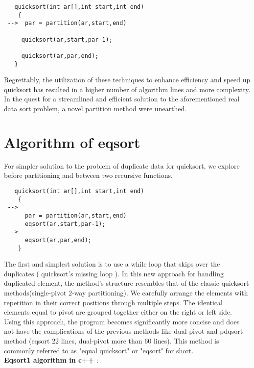 \documentclass{article}
\begin{document}
\begin{lstlisting}
   quicksort(int ar[],int start,int end)
    {
 -->  par = partition(ar,start,end)

     quicksort(ar,start,par-1);

     quicksort(ar,par,end);
   }
\end{lstlisting}

 Regrettably, the utilization of these techniques to enhance efficiency and speed up quicksort has resulted in a higher number of algorithm lines and more complexity. In the quest for a streamlined and efficient solution to the aforementioned real data sort problem, a novel partition method were unearthed.\\

\section {Algorithm of eqsort}

  For simpler solution to the problem of duplicate data for quicksort, we explore before partitioning and between two recursive functions.\\

\begin{lstlisting}
   quicksort(int ar[],int start,int end)
    {
 -->
      par = partition(ar,start,end)
      eqsort(ar,start,par-1);
 -->
      eqsort(ar,par,end);
    }
\end{lstlisting}
The first and simplest solution is to use a while loop that skips over the duplicates ( quicksort's missing loop ). In this new approach for handling duplicated element, the method's structure resembles that of the classic quicksort methods(single-pivot 2-way partitioning). We carefully arrange the elements with repetition in their correct positions through multiple steps. The identical elements equal to pivot are grouped together either on the right or left side. Using this approach, the program becomes significantly more concise and does not have the complications of the previous methods like dual-pivot and pdqsort method  (eqsort 22 lines, dual-pivot more than 60 lines). This method is commonly referred to as "equal quicksort" or "eqsort" for short.\\

\textbf{Eqsort1 algorithm in c++ }:
\end{document}
